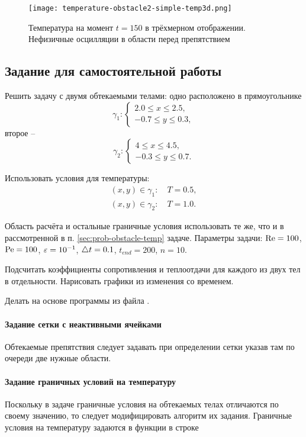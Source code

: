 \begin{figure}[h!]
\centering
\texttt{[image: temperature-obstacle2-simple-temp3d.png]}
\caption{Температура на момент $t=150$ в трёхмерном отображении. Нефизичные осцилляции в области перед препятствием}
\label{fig:temperature-obstacle2-simple-temp3d}
\end{figure}


\subsection{Задание для самостоятельной работы}
Решить задачу с двумя обтекаемыми телами: одно расположено
в прямоугольнике
$$
\gamma_1: \begin{cases}
2.0 \leq x \leq 2.5, \\
-0.7 \leq y \leq 0.3,
\end{cases}
$$
второе --
$$
\gamma_2: \begin{cases}
4 \leq x \leq 4.5, \\
-0.3 \leq y \leq 0.7.
\end{cases}
$$

Использовать условия для температуры:
\begin{align*}
(x, y) \in \gamma_1: \quad T=0.5,\\
(x, y) \in \gamma_2: \quad T=1.0.
\end{align*}

Область расчёта и остальные граничные условия использовать те же, что и
в рассмотренной в п. \ref{sec:prob-obstacle-temp} задаче.
Параметры задачи:
$\mathrm{Re} = 100$, $\mathrm{Pe} = 100$, $\varepsilon=10^{-1}$, $\triangle t = 0.1$, $t_{end} = 200$, $n=10$.

Подсчитать коэффициенты сопротивления и теплоотдачи для каждого из двух
тел в отдельности. Нарисовать графики из изменения со временем.

Делать на основе программы из файла .

\paragraph{Задание сетки с неактивными ячейками}
Обтекаемые препятствия следует задавать
при определении сетки
указав там по очереди две нужные области.

\paragraph{Задание граничных условий на температуру}
Поскольку в задаче граничные условия на обтекаемых
телах отличаются по своему значению, то следует
модифицировать алгоритм их задания.
Граничные условия на температуру задаются в функции 
в строке

